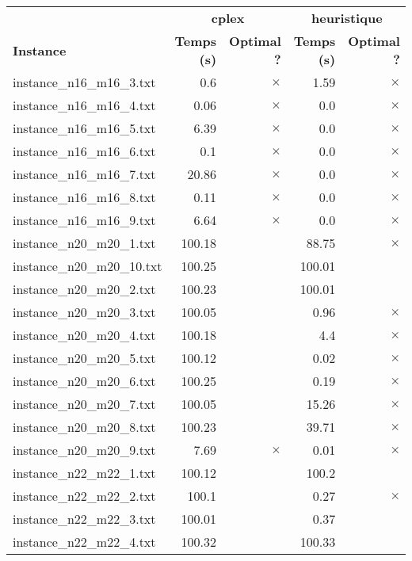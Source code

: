 \documentclass{article}
\begin{document}
\newpage
\begin{center}
\renewcommand{\arraystretch}{1.4} 
 \begin{tabular}{lrrrr}
	\hline
 & \multicolumn{2}{c}{\textbf{cplex}} & \multicolumn{2}{c}{\textbf{heuristique}}\\
\textbf{Instance}  & \textbf{Temps (s)} & \textbf{Optimal ?}  & \textbf{Temps (s)} & \textbf{Optimal ?} \\\hline

instance\_n16\_m16\_3.txt & 0.6 & 
$\times$
 & 1.59 & 
$\times$
\\
instance\_n16\_m16\_4.txt & 0.06 & 
$\times$
 & 0.0 & 
$\times$
\\
instance\_n16\_m16\_5.txt & 6.39 & 
$\times$
 & 0.0 & 
$\times$
\\
instance\_n16\_m16\_6.txt & 0.1 & 
$\times$
 & 0.0 & 
$\times$
\\
instance\_n16\_m16\_7.txt & 20.86 & 
$\times$
 & 0.0 & 
$\times$
\\
instance\_n16\_m16\_8.txt & 0.11 & 
$\times$
 & 0.0 & 
$\times$
\\
instance\_n16\_m16\_9.txt & 6.64 & 
$\times$
 & 0.0 & 
$\times$
\\
instance\_n20\_m20\_1.txt & 100.18 & 
 & 88.75 & 
$\times$
\\
instance\_n20\_m20\_10.txt & 100.25 & 
 & 100.01 & 
\\
instance\_n20\_m20\_2.txt & 100.23 & 
 & 100.01 & 
\\
instance\_n20\_m20\_3.txt & 100.05 & 
 & 0.96 & 
$\times$
\\
instance\_n20\_m20\_4.txt & 100.18 & 
 & 4.4 & 
$\times$
\\
instance\_n20\_m20\_5.txt & 100.12 & 
 & 0.02 & 
$\times$
\\
instance\_n20\_m20\_6.txt & 100.25 & 
 & 0.19 & 
$\times$
\\
instance\_n20\_m20\_7.txt & 100.05 & 
 & 15.26 & 
$\times$
\\
instance\_n20\_m20\_8.txt & 100.23 & 
 & 39.71 & 
$\times$
\\
instance\_n20\_m20\_9.txt & 7.69 & 
$\times$
 & 0.01 & 
$\times$
\\
instance\_n22\_m22\_1.txt & 100.12 & 
 & 100.2 & 
\\
instance\_n22\_m22\_2.txt & 100.1 & 
 & 0.27 & 
$\times$
\\
instance\_n22\_m22\_3.txt & 100.01 & 
 & 0.37 & 
\\
instance\_n22\_m22\_4.txt & 100.32 & 
 & 100.33 & 
\\

\end{tabular}
\end{center}
\end{document}
